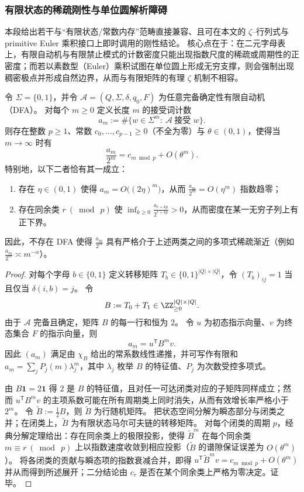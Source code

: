 \subsubsection{有限状态的稀疏刚性与单位圆解析障碍}\label{subsubsec:zeta-syntax-finite-state-sparsity-rigidity}
本段给出若干与“有限状态/常数内存”范畴直接兼容、且可在本文的 \(\zeta\)–行列式与 primitive Euler 乘积接口上即时调用的刚性结论。
核心点在于：在二元字母表上，有限自动机与有限禁止模式的计数密度只能出现指数尺度的稀疏或周期性的正密度；而若以素数型（Euler）乘积试图在单位圆上形成无穷支撑，则会强制出现稠密极点并形成自然边界，从而与有限矩阵的有理 \(\zeta\) 机制不相容。

\begin{theorem}\label{thm:zeta-syntax-dfa-density-dichotomy}
令 \(\Sigma=\{0,1\}\)，并令 \(\mathcal A=(Q,\Sigma,\delta,q_0,F)\) 为任意完备确定性有限自动机（DFA）。
对每个 \(m\ge 0\) 定义长度 \(m\) 的接受词计数
\[
a_m:=\#\{w\in\Sigma^m:\ \mathcal A\ \text{接受 }w\}.
\]
则存在整数 \(p\ge 1\)、常数 \(c_0,\dots,c_{p-1}\ge 0\)（不全为零）与 \(\theta\in(0,1)\)，使得当 \(m\to\infty\) 时有
\[
\frac{a_m}{2^m}=c_{m\bmod p}+O(\theta^m).
\]
特别地，以下二者恰有其一成立：
\begin{enumerate}
  \item 存在 \(\eta\in(0,1)\) 使得 \(a_m=O\bigl((2\eta)^m\bigr)\)，从而 \(\frac{a_m}{2^m}=O(\eta^m)\) 指数趋零；
  \item 存在同余类 \(r\ (\bmod\ p)\) 使 \(\inf_{k\ge 0}\frac{a_{r+kp}}{2^{r+kp}}>0\)，从而密度在某一无穷子列上有正下界。
\end{enumerate}
因此，不存在 DFA 使得 \(\frac{a_m}{2^m}\) 具有严格介于上述两类之间的多项式稀疏渐近（例如 \(\frac{a_m}{2^m}\asymp m^{-\alpha}\)）。
\end{theorem}
\begin{proof}
对每个字母 \(b\in\{0,1\}\) 定义转移矩阵 \(T_b\in\{0,1\}^{|Q|\times|Q|}\)，令 \((T_b)_{ij}=1\) 当且仅当 \(\delta(i,b)=j\)。
令
\[
B:=T_0+T_1\in \ZZ_{\ge 0}^{|Q|\times|Q|}.
\]
由于 \(\mathcal A\) 完备且确定，矩阵 \(B\) 的每一行和恒为 \(2\)。
令 \(u\) 为初态指示向量、\(v\) 为终态集合 \(F\) 的指示向量，则
\[
a_m=u^{\mathsf T}B^m v.
\]
因此 \((a_m)\) 满足由 \(\chi_B\) 给出的常系数线性递推，并可写作有限和
\(
a_m=\sum_j P_j(m)\lambda_j^m
\)，其中 \(\lambda_j\) 枚举 \(B\) 的特征值、\(P_j\) 为次数受控多项式。
\par
由 \(B\mathbf 1=2\mathbf 1\) 得 \(2\) 是 \(B\) 的特征值，且对任一可达闭类对应的子矩阵同样成立；然而 \(u^{\mathsf T}B^m v\) 的主项系数可能在所有周期类上同时消失，从而有效增长率严格小于 \(2^m\)。
令 \(\widetilde B:=\tfrac12 B\)，则 \(\widetilde B\) 为行随机矩阵。
把状态空间分解为瞬态部分与闭类之并；在闭类上，\(\widetilde B\) 为有限状态马尔可夫链的转移矩阵。
对每个闭类的周期 \(p\)，经典分解定理给出：存在同余类上的极限投影，使得 \(\widetilde B^m\) 在每个同余类 \(m\equiv r\ (\bmod\ p)\) 上以指数速度收敛到相应投影（\(\widetilde B\) 的谱隙保证误差为 \(O(\theta^m)\)）。
将各闭类的贡献与瞬态项的指数衰减合并，即得
\(
u^{\mathsf T}\widetilde B^m v=c_{m\bmod p}+O(\theta^m)
\)
并从而得到所述展开；二分结论由 \(c_r\) 是否在某个同余类上严格为零决定。证毕。
\end{proof}

